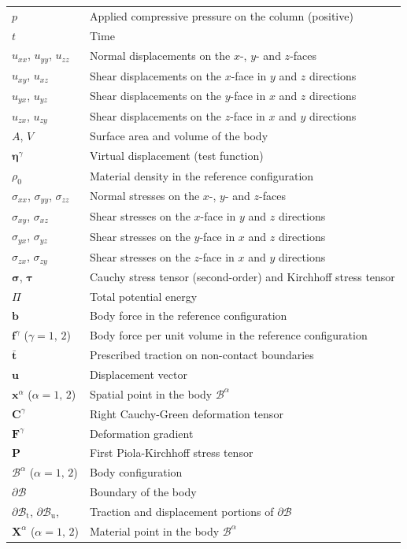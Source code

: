 \documentclass[review, authoryear, 12pt]{elsarticle}
\begin{document}
\begin{longtable}{@{}ll@{}}
    $p$ & Applied compressive pressure on the column (positive) \\
    $t$ & Time \\
    $u_{xx}$, $u_{yy}$, $u_{zz}$ & Normal displacements on the $x$-, $y$- and $z$-faces \\
    $u_{xy}$, $u_{xz}$ & Shear displacements on the $x$-face in $y$ and $z$ directions \\
    $u_{yx}$, $u_{yz}$ & Shear displacements on the $y$-face in $x$ and $z$ directions \\
    $u_{zx}$, $u_{zy}$ & Shear displacements on the $z$-face in $x$ and $y$ directions \\
    $A$, $V$ & Surface area and volume of the body \\
    $\bm{\eta}^{\gamma}$ & Virtual displacement (test function) \\
    $\rho_0$ & Material density in the reference configuration \\
    $\sigma_{xx}$, $\sigma_{yy}$, $\sigma_{zz}$ & Normal stresses on the $x$-, $y$- and $z$-faces \\
    $\sigma_{xy}$, $\sigma_{xz}$ & Shear stresses on the $x$-face in $y$ and $z$ directions \\
    $\sigma_{yx}$, $\sigma_{yz}$ & Shear stresses on the $y$-face in $x$ and $z$ directions \\
    $\sigma_{zx}$, $\sigma_{zy}$ & Shear stresses on the $z$-face in $x$ and $y$ directions \\
    $\bm{\sigma}$, $\bm{\tau}$ & Cauchy stress tensor (second-order) and Kirchhoff stress tensor \\
    $\Pi$ & Total potential energy \\
    $\mathbf{b}$ & Body force in the reference configuration \\
    $\mathbf{f}^{\gamma}$ ($\gamma = 1, \, 2$) & Body force per unit volume in the reference configuration \\
    $\bar{\mathbf{t}}$ & Prescribed traction on non-contact boundaries \\
    $\mathbf{u}$ & Displacement vector \\
    $\mathbf{x}^{\alpha}$ ($\alpha = 1, \, 2$) & Spatial point in the body $\bm{\mathcal{B}}^{\alpha}$ \\
    $\mathbf{C}^{\gamma}$ & Right Cauchy-Green deformation tensor \\
    $\mathbf{F}^{\gamma}$ & Deformation gradient \\
    $\mathbf{P}$ & First Piola-Kirchhoff stress tensor \\
    $\bm{\mathcal{B}}^{\alpha}$ ($\alpha = 1, \, 2$) & Body configuration \\
    $\partial \bm{\mathcal{B}}$ & Boundary of the body \\
    $\partial\mathcal{B}_{\mathrm{t}}$,
    $\partial\mathcal{B}_{\mathrm{u}}$,
    & Traction and displacement portions of $\partial\mathcal{B}$ \\
    $\mathbf{X}^{\alpha}$ ($\alpha = 1, \, 2$) & Material point in the body $\bm{\mathcal{B}}^{\alpha}$ \\[6pt]



\end{longtable}
\end{document}

